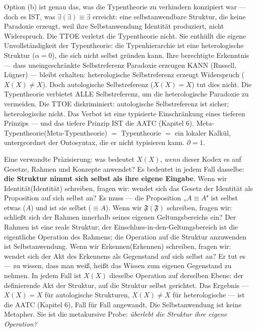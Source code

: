 \documentclass[10pt, openany, oneside]{book}
\begin{document}
Option (b) ist genau das, was die Typentheorie zu verhindern konzipiert war --- doch es IST, was $\exists(\exists) \equiv \exists$ erreicht: eine selbstanwendbare Struktur, die keine Paradoxie erzeugt, weil ihre Selbstanwendung Identität produziert, nicht Widerspruch. Die TTOE verletzt die Typentheorie nicht. Sie enthüllt die eigene Unvollständigkeit der Typentheorie: die Typenhierarchie ist eine heterologische Struktur ($\alpha = 0$), die sich nicht selbst gründen kann. Ihre berechtigte Erkenntnis --- dass uneingeschränkte Selbstreferenz Paradoxie erzeugen KANN (Russell, Lügner) --- bleibt erhalten: heterologische Selbstreferenz erzeugt Widerspruch ($X(X) \neq X$). Doch autologische Selbstreferenz ($X(X) = X$) tut dies nicht. Die Typentheorie verbietet ALLE Selbstreferenz, um die heterologische Paradoxie zu vermeiden. Die TTOE diskriminiert: autologische Selbstreferenz ist sicher; heterologische nicht. Das Verbot ist eine typisierte Einschränkung eines tieferen Prinzips --- und das tiefere Prinzip IST die AATC (Kapitel 6). Meta-Typentheorie(Meta-Typentheorie) $=$ Typentheorie $=$ ein lokaler Kalkül, untergeordnet der Ontosyntax, die er nicht typisieren kann. $\partial = 1$.

Eine verwandte Präzisierung: was bedeutet $X(X)$, \textit{wenn} dieser Kodex es auf Gesetze, Rahmen und Konzepte anwendet? Es bedeutet in jedem Fall dasselbe: \textbf{die Struktur nimmt sich selbst als ihre eigene Eingabe}. Wenn wir Identität(Identität) schreiben, fragen wir: wendet sich das Gesetz der Identität als Proposition auf sich selbst an? Es muss --- die Proposition „$A \equiv A$" ist selbst etwas ($A$) und ist sie selbst ($\equiv A$). Wenn wir $\mathfrak{F}(\mathfrak{F})$ schreiben, fragen wir: schließt sich der Rahmen innerhalb seines eigenen Geltungsbereichs ein? Der Rahmen ist eine reale Struktur; der Einschluss-in-den-Geltungsbereich ist die eigentliche Operation des Rahmens; die Operation auf die Struktur anzuwenden ist Selbstanwendung. Wenn wir Erkennen(Erkennen) schreiben, fragen wir: wendet sich der Akt des Erkennens als Gegenstand auf sich selbst an? Er tut es --- zu wissen, dass man weiß, heißt das Wissen zum eigenen Gegenstand zu nehmen. In jedem Fall ist $X(X)$ dieselbe Operation auf derselben Ebene: der definierende Akt der Struktur, auf die Struktur selbst gerichtet. Das Ergebnis --- $X(X) = X$ für autologische Strukturen, $X(X) \neq X$ für heterologische --- ist die AATC (Kapitel 6), Fall für Fall angewandt. Die Selbstanwendung ist keine Metapher. Sie ist die metakursive Probe: \textit{überlebt die Struktur ihre eigene Operation?}
\end{document}
